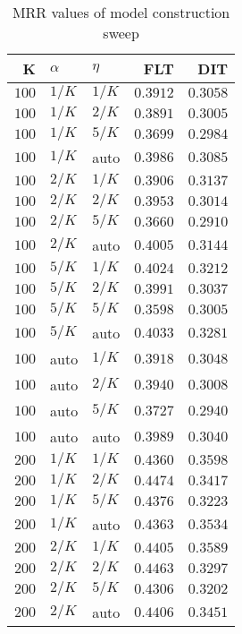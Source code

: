 
\begin{table}
\begin{spacing}{1.2}
\centering
\caption{MRR values of \zookeeper model construction sweep}
\label{table:zookeeper_model_sweep}
\vspace{0.2em}
\parbox{.45\linewidth}{\centering \begin{tabular}{rll|rr}
\toprule
    K &  $\alpha$ &    $\eta$ &      FLT &      DIT \\
\midrule
$100$ &  $1/K$ &  $1/K$ & $0.3912$ & $0.3058$ \\
$100$ &  $1/K$ &  $2/K$ & $0.3891$ & $0.3005$ \\
$100$ &  $1/K$ &  $5/K$ & $0.3699$ & $0.2984$ \\
$100$ &  $1/K$ &   auto & $0.3986$ & $0.3085$ \\
$100$ &  $2/K$ &  $1/K$ & $0.3906$ & $0.3137$ \\
$100$ &  $2/K$ &  $2/K$ & $0.3953$ & $0.3014$ \\
$100$ &  $2/K$ &  $5/K$ & $0.3660$ & $0.2910$ \\
$100$ &  $2/K$ &   auto & $0.4005$ & $0.3144$ \\
$100$ &  $5/K$ &  $1/K$ & $0.4024$ & $0.3212$ \\
$100$ &  $5/K$ &  $2/K$ & $0.3991$ & $0.3037$ \\
$100$ &  $5/K$ &  $5/K$ & $0.3598$ & $0.3005$ \\
$100$ &  $5/K$ &   auto & $0.4033$ & $0.3281$ \\
$100$ &   auto &  $1/K$ & $0.3918$ & $0.3048$ \\
$100$ &   auto &  $2/K$ & $0.3940$ & $0.3008$ \\
$100$ &   auto &  $5/K$ & $0.3727$ & $0.2940$ \\
$100$ &   auto &   auto & $0.3989$ & $0.3040$ \\
$200$ &  $1/K$ &  $1/K$ & $0.4360$ & $0.3598$ \\
$200$ &  $1/K$ &  $2/K$ & $0.4474$ & $0.3417$ \\
$200$ &  $1/K$ &  $5/K$ & $0.4376$ & $0.3223$ \\
$200$ &  $1/K$ &   auto & $0.4363$ & $0.3534$ \\
$200$ &  $2/K$ &  $1/K$ & $0.4405$ & $0.3589$ \\
$200$ &  $2/K$ &  $2/K$ & $0.4463$ & $0.3297$ \\
$200$ &  $2/K$ &  $5/K$ & $0.4306$ & $0.3202$ \\
$200$ &  $2/K$ &   auto & $0.4406$ & $0.3451$ \\

\end{tabular}}
\end{spacing}
\end{table}
